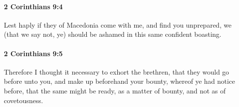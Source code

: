 		\paragraph{2 Corinthians 9:4} %
			\label{2CORINTHIANS-9-4}

			Lest haply if they of Macedonia come with me, and find you unprepared, we (that we say not, ye) should be ashamed in this same confident boasting.

			\begin{framed}
			\scriptsize
				\begin{compactdesc}
					\item[SBLG] 
				\end{compactdesc}
			\end{framed}

		\paragraph{2 Corinthians 9:5} %
			\label{2CORINTHIANS-9-5}

			Therefore I thought it necessary to exhort the brethren, that they would go before unto you, and make up beforehand your bounty, whereof ye had notice before, that the same might be ready, as a matter of bounty, and not as of covetousness.

